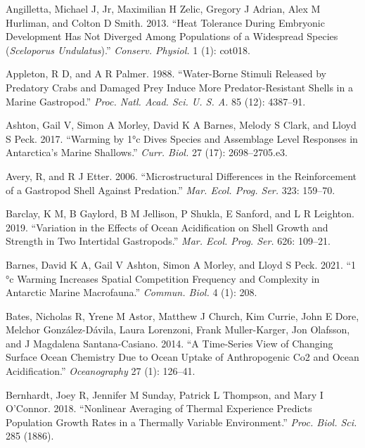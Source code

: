 \documentclass[smallextended]{svjour3}       %
\newlength{\cslhangindent}
\newenvironment{CSLReferences}[2] %
 {%
  \setlength{\parindent}{0pt}
  \ifodd #1 \everypar{\setlength{\hangindent}{\cslhangindent}}\ignorespaces\fi
  \ifnum #2 > 0
  \setlength{\parskip}{#2\baselineskip}
  \fi
 }%
 {}
\begin{document}
\hypertarget{refs}{}
\begin{CSLReferences}{1}{0}
\leavevmode{}%
Angilletta, Michael J, Jr, Maximilian H Zelic, Gregory J Adrian, Alex M
Hurliman, and Colton D Smith. 2013. {``Heat Tolerance During Embryonic
Development Has Not Diverged Among Populations of a Widespread Species
(\emph{Sceloporus Undulatus}).''} \emph{Conserv. Physiol.} 1 (1):
cot018.

\leavevmode{}%
Appleton, R D, and A R Palmer. 1988. {``Water-Borne Stimuli Released by
Predatory Crabs and Damaged Prey Induce More Predator-Resistant Shells
in a Marine Gastropod.''} \emph{Proc. Natl. Acad. Sci. U. S. A.} 85
(12): 4387--91.

\leavevmode{}%
Ashton, Gail V, Simon A Morley, David K A Barnes, Melody S Clark, and
Lloyd S Peck. 2017. {``Warming by 1°c Dives Species and Assemblage Level
Responses in Antarctica's Marine Shallows.''} \emph{Curr. Biol.} 27
(17): 2698--2705.e3.

\leavevmode{}%
Avery, R, and R J Etter. 2006. {``Microstructural Differences in the
Reinforcement of a Gastropod Shell Against Predation.''} \emph{Mar.
Ecol. Prog. Ser.} 323: 159--70.

\leavevmode{}%
Barclay, K M, B Gaylord, B M Jellison, P Shukla, E Sanford, and L R
Leighton. 2019. {``Variation in the Effects of Ocean Acidification on
Shell Growth and Strength in Two Intertidal Gastropods.''} \emph{Mar.
Ecol. Prog. Ser.} 626: 109--21.

\leavevmode{}%
Barnes, David K A, Gail V Ashton, Simon A Morley, and Lloyd S Peck.
2021. {``1 °c Warming Increases Spatial Competition Frequency and
Complexity in Antarctic Marine Macrofauna.''} \emph{Commun. Biol.} 4
(1): 208.

\leavevmode{}%
Bates, Nicholas R, Yrene M Astor, Matthew J Church, Kim Currie, John E
Dore, Melchor González-Dávila, Laura Lorenzoni, Frank Muller-Karger, Jon
Olafsson, and J Magdalena Santana-Casiano. 2014. {``A Time-Series View
of Changing Surface Ocean Chemistry Due to Ocean Uptake of Anthropogenic
Co2 and Ocean Acidification.''} \emph{Oceanography} 27 (1): 126--41.

\leavevmode{}%
Bernhardt, Joey R, Jennifer M Sunday, Patrick L Thompson, and Mary I
O'Connor. 2018. {``Nonlinear Averaging of Thermal Experience Predicts
Population Growth Rates in a Thermally Variable Environment.''}
\emph{Proc. Biol. Sci.} 285 (1886).


\end{CSLReferences}
\end{document}
